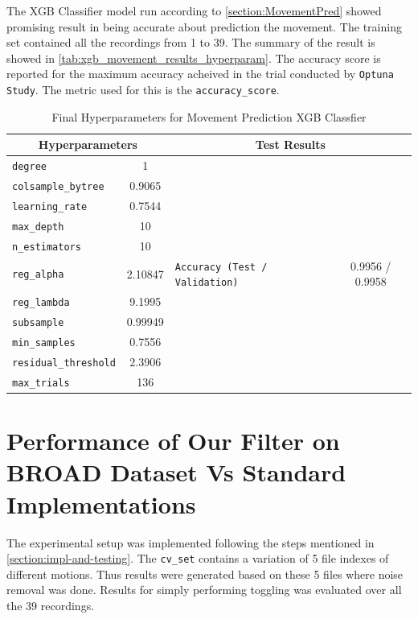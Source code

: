 \documentclass{iutbscthesis}
\begin{document}
The XGB Classifier model run according to \autoref{section:MovementPred} showed promising result in being accurate about prediction the movement. The training set contained all the recordings from 1 to 39. The summary of the result is showed in \autoref{tab:xgb_movement_results_hyperparam}. The accuracy score is reported for the maximum accuracy acheived in the trial conducted by \texttt{Optuna Study}. The metric used for this is the \texttt{accuracy\_score}\cite{labatut2012accuracy}.
\begin{table}[htbp]
\centering
\caption{Final Hyperparameters for Movement Prediction XGB Classfier}
\label{tab:xgb_movement_results_hyperparam}
\begin{tabular}{|l|c||p{}|c|}
    \hline
        \multicolumn{2}{|c||}{\textbf{Hyperparameters}} & \multicolumn{2}{c|}{\textbf{Test Results}} \\
        \hline
        \texttt{degree} & 1 &  &  \\
        \texttt{colsample\_bytree} & 0.9065 &  & \\
        \texttt{learning\_rate} & 0.7544 & & \\
        \texttt{max\_depth} & 10 & & \\
        \texttt{n\_estimators} & 10 & & \\
        \texttt{reg\_alpha} & 2.10847 & \texttt{Accuracy (Test / Validation)} & 0.9956 / 0.9958 \\
        \texttt{reg\_lambda} & 9.1995 & & \\
        \texttt{subsample} & 0.99949 & & \\
        \texttt{min\_samples} & 0.7556 & & \\
        \texttt{residual\_threshold} & 2.3906 & & \\
        \texttt{max\_trials} & 136 & & \\
        \hline
    \end{tabular}
\end{table}


\section{Performance of Our Filter on BROAD Dataset Vs Standard Implementations}

The experimental setup was implemented following the steps mentioned in \autoref{section:impl-and-testing}. The \texttt{cv\_set} contains a variation of 5 file indexes of different motions. Thus results were generated based on these 5 files where noise removal was done. Results for simply performing toggling was evaluated over all the 39 recordings.
\end{document}
